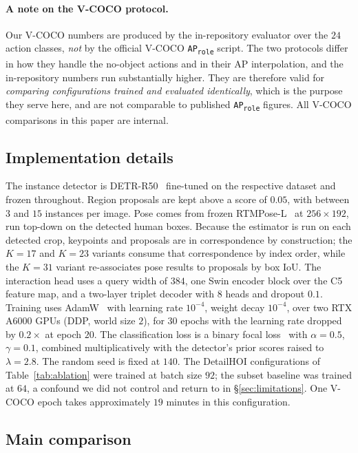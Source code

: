 \documentclass[12pt,a4paper]{article}
\begin{document}
\paragraph{A note on the V-COCO protocol.} Our V-COCO numbers are produced by
the in-repository evaluator over the $24$ action classes, \emph{not} by the
official V-COCO \texttt{AP\textsubscript{role}} script. The two protocols differ
in how they handle the no-object actions and in their AP interpolation, and the
in-repository numbers run substantially higher. They are therefore valid for
\emph{comparing configurations trained and evaluated identically}, which is the
purpose they serve here, and are not comparable to published
\texttt{AP\textsubscript{role}} figures. All V-COCO comparisons in this paper
are internal.

\subsection{Implementation details}
The instance detector is DETR-R50~\cite{carion2020detr} fine-tuned on the
respective dataset and frozen throughout. Region proposals are kept above a
score of $0.05$, with between $3$ and $15$ instances per image. Pose comes from
frozen RTMPose-L~\cite{jiang2023rtmpose} at $256 \times 192$, run top-down on
the detected human boxes. Because the estimator is run on each detected crop,
keypoints and proposals are in correspondence by construction; the $K{=}17$ and
$K{=}23$ variants consume that correspondence by index order, while the $K{=}31$
variant re-associates pose results to proposals by box IoU. The interaction head
uses a query width of $384$, one Swin encoder block over the C5 feature map, and
a two-layer triplet decoder with $8$ heads and dropout $0.1$. Training uses
AdamW~\cite{loshchilov2019adamw} with learning rate $10^{-4}$, weight decay
$10^{-4}$, over two RTX A6000 GPUs (DDP, world size $2$), for $30$ epochs with
the learning rate dropped by $0.2\times$ at epoch $20$. The
classification loss is a binary focal loss~\cite{lin2017focal} with
$\alpha = 0.5$, $\gamma = 0.1$, combined multiplicatively with the detector's
prior scores raised to $\lambda = 2.8$. The random seed is fixed at $140$. The
DetailHOI configurations of Table~\ref{tab:ablation} were trained at batch size
$92$; the subset baseline was trained at $64$, a confound we did not control and
return to in \S\ref{sec:limitations}. One V-COCO epoch takes approximately $19$
minutes in this configuration.

\subsection{Main comparison}
\end{document}
